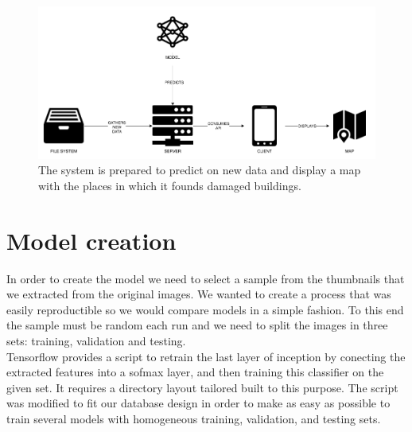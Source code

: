 \begin{figure}[h]
  \centering
  \includegraphics[width=1\textwidth]{images/predict-diagram.png}
  \caption{The system is prepared to predict on new data and display a map with the places in which it founds damaged buildings.}
  \label{fig:predict}
\end{figure}


\section{Model creation}

In order to create the model we need to select a sample from the thumbnails that we extracted from the original images. We wanted to create a process that was easily reproductible so we would compare models in a simple fashion. To this end the sample must be random each run and we need to split the images in three sets: training, validation and testing.\\

Tensorflow provides a script to retrain the last layer of inception by conecting the extracted features into a sofmax layer, and then training this classifier on the given set. It requires a directory layout tailored built to this purpose. The script was modified to fit our database design in order to make as easy as possible to train several models with homogeneous training, validation, and testing sets.


